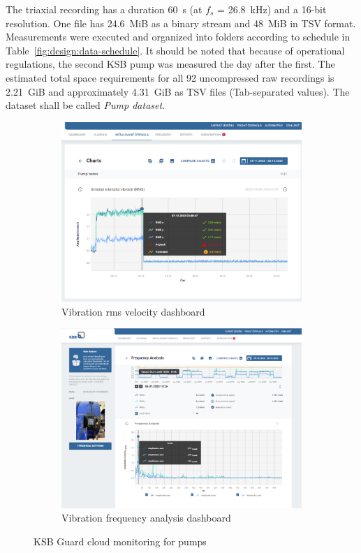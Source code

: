 The triaxial recording has a duration 60~s (at $f_s$ = 26.8~kHz) and a 16-bit resolution. One file has 24.6~MiB as a binary stream and 48~MiB in TSV format. 
Measurements were executed and organized into folders according to schedule in Table~\ref{fig:design:data-schedule}. It should be noted that because of operational regulations, the second KSB pump was measured the day after the first. The estimated total space requirements for all 92 uncompressed raw recordings is 2.21~GiB and approximately 4.31~GiB as TSV files (Tab-separated values). The dataset shall be called \emph{Pump dataset}.

\begin{figure}[h]
    \centering
    \begin{subfigure}[b]{0.49\textwidth}
    		\centering
        \includegraphics[width=\textwidth]{assets/design/ksb-guard-rms.png}
        \caption{Vibration rms velocity dashboard}
    \end{subfigure}
    \hfill
    \begin{subfigure}[b]{0.49\textwidth}
    		\centering
        \includegraphics[width=\textwidth]{assets/design/ksb-guard-spectrum.png}
        \caption{Vibration frequency analysis dashboard}
    \end{subfigure}
     \caption{KSB Guard cloud monitoring for pumps}
     \label{fig:design:ksb-guard}
\end{figure}

